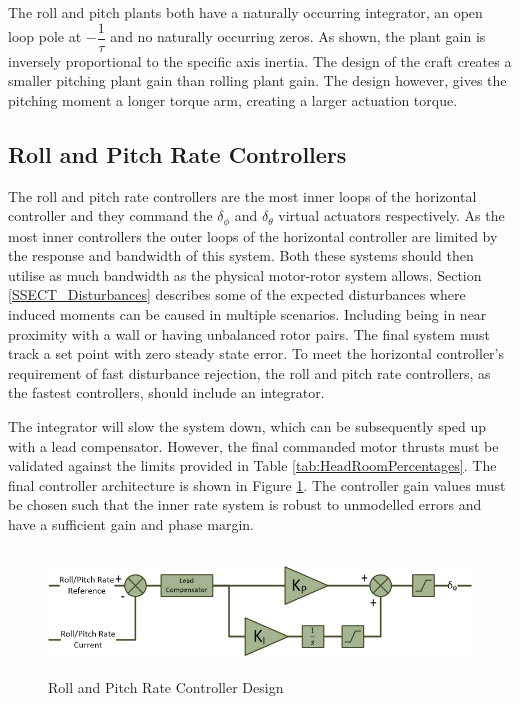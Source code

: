 	The roll and pitch plants both have a naturally occurring integrator, an open loop pole at $-\dfrac{1}{\tau}$ and no naturally occurring zeros. As shown, the plant gain is inversely proportional to the specific axis inertia. The design of the craft creates a smaller pitching plant gain than rolling plant gain. The design however, gives the pitching moment a longer torque arm, creating a larger actuation torque.
	
	\subsection{Roll and Pitch Rate Controllers}
	The roll and pitch rate controllers are the most inner loops of the horizontal controller and they command the $\delta_\phi$ and $\delta_\theta$ virtual actuators respectively. As the most inner controllers the outer loops of the horizontal controller are limited by the response and bandwidth of this system. Both these systems should then utilise as much bandwidth as the physical motor-rotor system allows. Section \ref{SSECT_Disturbances} describes some of the expected disturbances where induced moments can be caused in multiple scenarios. Including being in near proximity with a wall or having unbalanced rotor pairs. The final system must track a set point with zero steady state error. To meet the horizontal controller's requirement of fast disturbance rejection, the roll and pitch rate controllers, as the fastest controllers, should include an integrator. 
	
	The integrator will slow the system down, which can be subsequently sped up with a lead compensator. However, the final commanded motor thrusts must be validated against the limits provided in Table \ref{tab:HeadRoomPercentages}. The final controller architecture is shown in Figure \ref{IM_RollPitchRateController}. The controller gain values must be chosen such that the inner rate system is robust to unmodelled errors and have a sufficient gain and phase margin.
	
	\begin{figure}[H]
		\centering
		\includegraphics[height = 3.3cm]{../References/Diagrams/RollRateController.jpg}
		\caption{Roll and Pitch Rate Controller Design}
		\label{IM_RollPitchRateController}
	\end{figure}	
		
